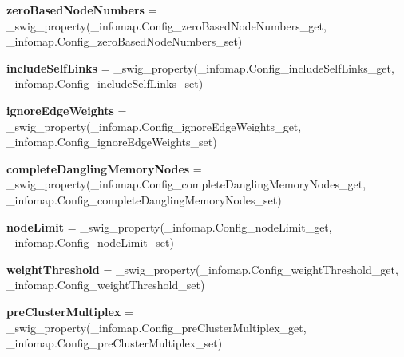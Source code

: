 \begin{DoxyCompactItemize}
{\bfseries zero\+Based\+Node\+Numbers} = \+\_\+swig\+\_\+property(\+\_\+infomap.\+Config\+\_\+zero\+Based\+Node\+Numbers\+\_\+get, \+\_\+infomap.\+Config\+\_\+zero\+Based\+Node\+Numbers\+\_\+set)
\item 
\mbox{\label{classinfomapfolder_1_1infomap_1_1Config_a772555041e7ff99539f83973537b2000}} 
{\bfseries include\+Self\+Links} = \+\_\+swig\+\_\+property(\+\_\+infomap.\+Config\+\_\+include\+Self\+Links\+\_\+get, \+\_\+infomap.\+Config\+\_\+include\+Self\+Links\+\_\+set)
\item 
\mbox{\label{classinfomapfolder_1_1infomap_1_1Config_abdab83a2b853973f5726f42ac6f918bc}} 
{\bfseries ignore\+Edge\+Weights} = \+\_\+swig\+\_\+property(\+\_\+infomap.\+Config\+\_\+ignore\+Edge\+Weights\+\_\+get, \+\_\+infomap.\+Config\+\_\+ignore\+Edge\+Weights\+\_\+set)
\item 
\mbox{\label{classinfomapfolder_1_1infomap_1_1Config_ac49f97251c4a4719606018d4bef4cb63}} 
{\bfseries complete\+Dangling\+Memory\+Nodes} = \+\_\+swig\+\_\+property(\+\_\+infomap.\+Config\+\_\+complete\+Dangling\+Memory\+Nodes\+\_\+get, \+\_\+infomap.\+Config\+\_\+complete\+Dangling\+Memory\+Nodes\+\_\+set)
\item 
\mbox{\label{classinfomapfolder_1_1infomap_1_1Config_ae902d97c54268de05e17c1b3794fb360}} 
{\bfseries node\+Limit} = \+\_\+swig\+\_\+property(\+\_\+infomap.\+Config\+\_\+node\+Limit\+\_\+get, \+\_\+infomap.\+Config\+\_\+node\+Limit\+\_\+set)
\item 
\mbox{\label{classinfomapfolder_1_1infomap_1_1Config_aad919eaa24b5302ea8c7705461f7ab88}} 
{\bfseries weight\+Threshold} = \+\_\+swig\+\_\+property(\+\_\+infomap.\+Config\+\_\+weight\+Threshold\+\_\+get, \+\_\+infomap.\+Config\+\_\+weight\+Threshold\+\_\+set)
\item 
\mbox{\label{classinfomapfolder_1_1infomap_1_1Config_a6bfaefba9fddd9b430bc446f53789fd4}} 
{\bfseries pre\+Cluster\+Multiplex} = \+\_\+swig\+\_\+property(\+\_\+infomap.\+Config\+\_\+pre\+Cluster\+Multiplex\+\_\+get, \+\_\+infomap.\+Config\+\_\+pre\+Cluster\+Multiplex\+\_\+set)

\end{DoxyCompactItemize}
